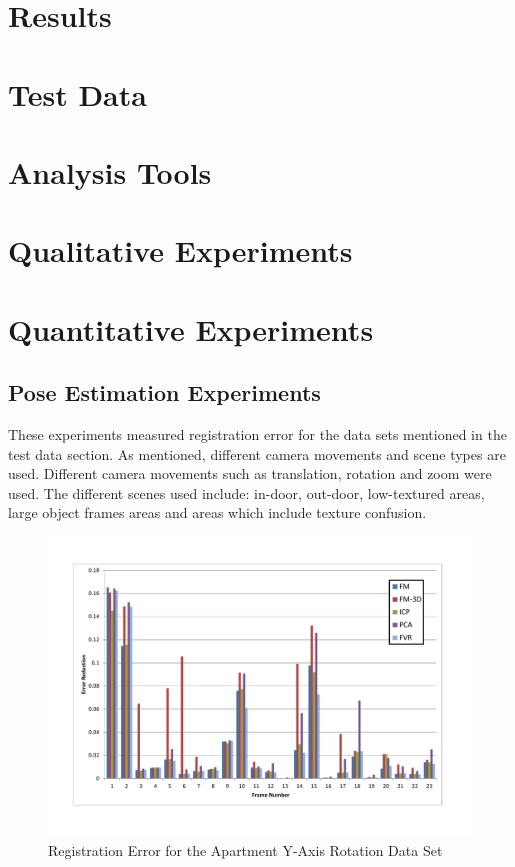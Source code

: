 \section{Results}

\section{Test Data}

\section{Analysis Tools}

\section{Qualitative Experiments}

\section{Quantitative Experiments}

\subsection{Pose Estimation Experiments}

These experiments measured registration error for the data sets mentioned in the test data section. As mentioned, different camera movements and scene types are used. Different camera movements such as translation, rotation and zoom were used. The different scenes used include: in-door, out-door, low-textured areas, large object frames areas and areas which include texture confusion. \\


\begin{figure}[t]
\centering
\includegraphics[width=6.0in]{images/results/Apartment_Texture_Rotate}
\caption{Registration Error for the Apartment Y-Axis Rotation Data Set}
\label{fig:PET0}
\end{figure}

